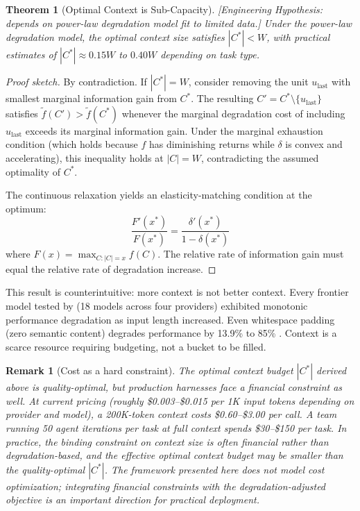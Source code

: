\documentclass[11pt, a4paper, logo, copyright]{googledeepmind}
\newtheorem{theorem}{Theorem}[section]
\newtheorem*{remark}{Remark}
\begin{document}
\begin{theorem}[Optimal Context is Sub-Capacity]
\emph{[Engineering Hypothesis: depends on power-law degradation model fit to limited data.]}
\label{thm:context-budget}
Under the power-law degradation model, the optimal context size satisfies $|C^*| < W$, with practical estimates of $|C^*| \approx 0.15W$ to $0.40W$ depending on task type.
\end{theorem}

\begin{proof}[Proof sketch]
By contradiction. If $|C^*| = W$, consider removing the unit $u_{\text{last}}$ with smallest marginal information gain from $C^*$. The resulting $C' = C^* \setminus \{u_{\text{last}}\}$ satisfies $\tilde{f}(C') > \tilde{f}(C^*)$ whenever the marginal degradation cost of including $u_{\text{last}}$ exceeds its marginal information gain. Under the marginal exhaustion condition (which holds because $f$ has diminishing returns while $\delta$ is convex and accelerating), this inequality holds at $|C| = W$, contradicting the assumed optimality of $C^*$.

The continuous relaxation yields an elasticity-matching condition at the optimum:
\[
    \frac{F'(x^*)}{F(x^*)} = \frac{\delta'(x^*)}{1 - \delta(x^*)}
\]
where $F(x) = \max_{C:|C|=x} f(C)$. The relative rate of information gain must equal the relative rate of degradation increase.
\end{proof}

This result is counterintuitive: more context is not better context. Every frontier model tested by \citet{chroma2025contextrot} (18 models across four providers) exhibited monotonic performance degradation as input length increased. Even whitespace padding (zero semantic content) degrades performance by 13.9\% to 85\% \citep{du2025context}. Context is a scarce resource requiring budgeting, not a bucket to be filled.

\begin{remark}[Cost as a hard constraint]
The optimal context budget $|C^*|$ derived above is quality-optimal, but production harnesses face a financial constraint as well. At current pricing (roughly \$0.003--\$0.015 per 1K input tokens depending on provider and model), a 200K-token context costs \$0.60--\$3.00 per call. A team running 50 agent iterations per task at full context spends \$30--\$150 per task. In practice, the binding constraint on context size is often financial rather than degradation-based, and the effective optimal context budget may be smaller than the quality-optimal $|C^*|$. The framework presented here does not model cost optimization; integrating financial constraints with the degradation-adjusted objective is an important direction for practical deployment.
\end{remark}
\end{document}
